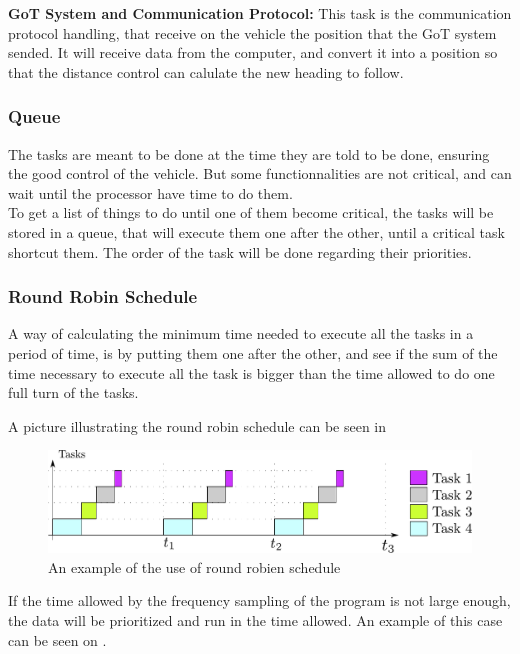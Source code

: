 \textbf{GoT System and Communication Protocol:}
This task is the communication protocol handling, that receive on the vehicle the position that the GoT system sended. It will receive data from the computer, and convert it into a position so that the distance control can calulate the new heading to follow.


\subsubsection{Queue}
The tasks are meant to be done at the time they are told to be done, ensuring the good control of the vehicle. But some functionnalities are not critical, and can wait until the processor have time to do them.\\
To get a list of things to do until one of them become critical, the tasks will be stored in a queue, that will execute them one after the other, until a critical task shortcut them. The order of the task will be done regarding their priorities.


\subsubsection{Round Robin Schedule}
A way of calculating the minimum time needed to execute all the tasks in a period of time, is by putting them one after the other, and see if the sum of the time necessary to execute all the task is bigger than the time allowed to do one full turn of the tasks.

A picture illustrating the round robin schedule can be seen in \\

 \begin{figure}[H]
	\centering
	\includegraphics[scale=0.5]{figures/roundRobinSchedule.pdf}
	\caption{An example of the use of round robien schedule}
	\label{roundRobinSchedule}
\end{figure}

If the time allowed by the frequency sampling of the program is not large enough, the data will be prioritized and run in the time allowed. An example of this case can be seen on .

